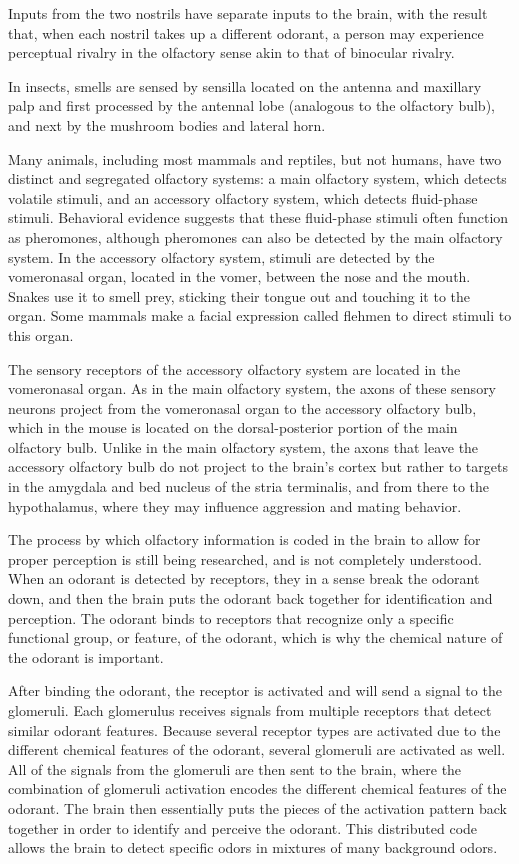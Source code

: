\documentclass[]{book}
\begin{document}
Inputs from the two nostrils have separate inputs to the brain, with the result that, when each nostril takes up a different odorant, a person may experience perceptual rivalry in the olfactory sense akin to that of binocular rivalry.

In insects, smells are sensed by sensilla located on the antenna and maxillary palp and first processed by the antennal lobe (analogous to the olfactory bulb), and next by the mushroom bodies and lateral horn.

Many animals, including most mammals and reptiles, but not humans, have two distinct and segregated olfactory systems: a main olfactory system, which detects volatile stimuli, and an accessory olfactory system, which detects fluid-phase stimuli. Behavioral evidence suggests that these fluid-phase stimuli often function as pheromones, although pheromones can also be detected by the main olfactory system. In the accessory olfactory system, stimuli are detected by the vomeronasal organ, located in the vomer, between the nose and the mouth. Snakes use it to smell prey, sticking their tongue out and touching it to the organ. Some mammals make a facial expression called flehmen to direct stimuli to this organ.

The sensory receptors of the accessory olfactory system are located in the vomeronasal organ. As in the main olfactory system, the axons of these sensory neurons project from the vomeronasal organ to the accessory olfactory bulb, which in the mouse is located on the dorsal-posterior portion of the main olfactory bulb. Unlike in the main olfactory system, the axons that leave the accessory olfactory bulb do not project to the brain's cortex but rather to targets in the amygdala and bed nucleus of the stria terminalis, and from there to the hypothalamus, where they may influence aggression and mating behavior.

The process by which olfactory information is coded in the brain to allow for proper perception is still being researched, and is not completely understood. When an odorant is detected by receptors, they in a sense break the odorant down, and then the brain puts the odorant back together for identification and perception. The odorant binds to receptors that recognize only a specific functional group, or feature, of the odorant, which is why the chemical nature of the odorant is important.

After binding the odorant, the receptor is activated and will send a signal to the glomeruli. Each glomerulus receives signals from multiple receptors that detect similar odorant features. Because several receptor types are activated due to the different chemical features of the odorant, several glomeruli are activated as well. All of the signals from the glomeruli are then sent to the brain, where the combination of glomeruli activation encodes the different chemical features of the odorant. The brain then essentially puts the pieces of the activation pattern back together in order to identify and perceive the odorant. This distributed code allows the brain to detect specific odors in mixtures of many background odors.
\end{document}
